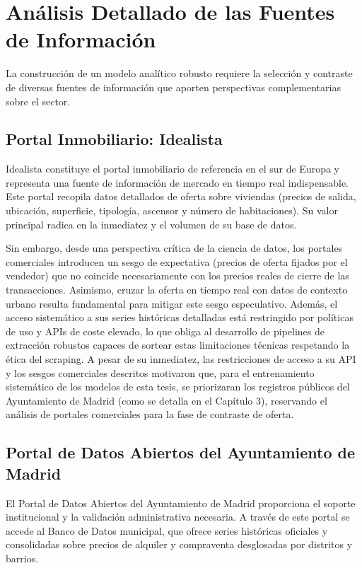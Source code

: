 \documentclass[a4paper,11pt,openany]{book}
\begin{document}
\section{Análisis Detallado de las Fuentes de Información}
La construcción de un modelo analítico robusto requiere la selección y contraste de diversas fuentes de información que aporten perspectivas complementarias sobre el sector.

\subsection{Portal Inmobiliario: Idealista}
Idealista constituye el portal inmobiliario de referencia en el sur de Europa y representa una fuente de información de mercado en tiempo real indispensable. Este portal recopila datos detallados de oferta sobre viviendas (precios de salida, ubicación, superficie, tipología, ascensor y número de habitaciones). Su valor principal radica en la inmediatez y el volumen de su base de datos.

Sin embargo, desde una perspectiva crítica de la ciencia de datos, los portales comerciales introducen un sesgo de expectativa (precios de oferta fijados por el vendedor) que no coincide necesariamente con los precios reales de cierre de las transacciones. Asimismo, cruzar la oferta en tiempo real con datos de contexto urbano resulta fundamental para mitigar este sesgo especulativo. Además, el acceso sistemático a sus series históricas detalladas está restringido por políticas de uso y APIs de coste elevado, lo que obliga al desarrollo de pipelines de extracción robustos capaces de sortear estas limitaciones técnicas respetando la ética del scraping. A pesar de su inmediatez, las restricciones de acceso a su API y los sesgos comerciales descritos motivaron que, para el entrenamiento sistemático de los modelos de esta tesis, se priorizaran los registros públicos del Ayuntamiento de Madrid (como se detalla en el Capítulo 3), reservando el análisis de portales comerciales para la fase de contraste de oferta.

\subsection{Portal de Datos Abiertos del Ayuntamiento de Madrid}
El Portal de Datos Abiertos del Ayuntamiento de Madrid proporciona el soporte institucional y la validación administrativa necesaria. A través de este portal se accede al Banco de Datos municipal, que ofrece series históricas oficiales y consolidadas sobre precios de alquiler y compraventa desglosadas por distritos y barrios.
\end{document}
